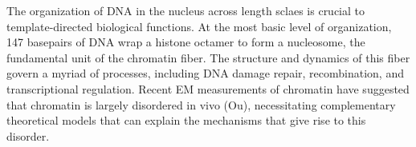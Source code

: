 \documentclass[%
 reprint,
superscriptaddress,
showpacs,preprintnumbers,
 amsmath,amssymb,
 aps,
 prl,
]{revtex4-1}
\begin{document}
\maketitle


The organization of DNA in the nucleus across length sclaes is crucial to
template-directed biological functions. At the most basic level of organization, 147
basepairs of DNA wrap a histone octamer to form a nucleosome, the fundamental
unit of the chromatin fiber. The structure and dynamics of this fiber
govern a myriad of processes, including DNA damage repair, recombination, and transcriptional regulation. Recent EM
measurements of chromatin have suggested that chromatin is largely disordered in vivo (Ou), necessitating complementary theoretical models that can
explain the mechanisms that give rise to this disorder.
\end{document}

